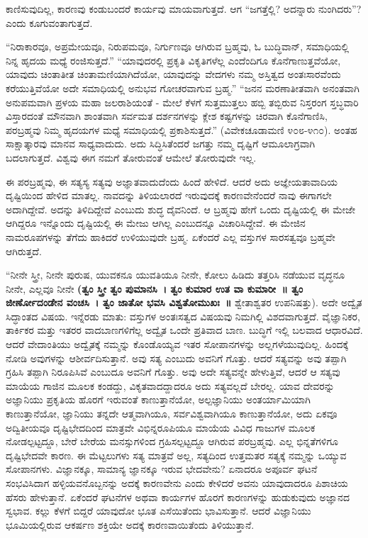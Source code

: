 ಕಾಣಿಸುವುದಿಲ್ಲ, ಕಾರಣವು ಕಂಡುಬಂದರೆ ಕಾರ್ಯವು ಮಾಯವಾಗುತ್ತದೆ. ಆಗ “ಜಗತ್ತೆಲ್ಲಿ? ಅದನ್ನಾರು ನುಂಗಿದರು”? ಎಂದು ಕೂಗುವಂತಾಗುತ್ತದೆ.

“ನಿರಾಕಾರವೂ, ಅಪ್ರಮೇಯವೂ, ನಿರುಪಮವೂ, ನಿರ್ಗುಣವೂ ಆಗಿರುವ ಬ್ರಹ್ಮವು, ಓ ಬುದ್ಧಿವಾನ್​, ಸಮಾಧಿಯಲ್ಲಿ ನಿನ್ನ ಹೃದಯ ಮಧ್ಯೆ ರಂಜಿಸುತ್ತದೆ.” “ಯಾವುದರಲ್ಲಿ ಪ್ರಕೃತಿ ವಿಕೃತಿಗಳೆಲ್ಲ ಎಂದೆಂದಿಗೂ ಕೊನೆಗಾಣುತ್ತವೆಯೋ, ಯಾವುದು ಚಿಂತಾತೀತ ಚಿಂತಾಮಣಿಯಾಗಿದೆಯೋ, ಯಾವುದನ್ನು ವೇದಗಳು ನಮ್ಮ ಅಸ್ತಿತ್ವದ ಅಂತಃಸಾರವೆಂದು ಕರೆಯುತ್ತಿವೆಯೋ ಅದೇ ಸಮಾಧಿಯಲ್ಲಿ ಅನುಭವ ಗೋಚರವಾಗುವ ಬ್ರಹ್ಮ.” “ಜನನ ಮರಣಾತೀತವಾಗಿ ಅನಂತವಾಗಿ ಅನುಪಮವಾಗಿ ಪ್ರಳಯ ಮಹಾ ಜಲರಾಶಿಯಂತೆ - ಮೇಲೆ ಕೆಳಗೆ ಸುತ್ತಮುತ್ತಲು ಹಬ್ಬಿ ತಬ್ಬಿರುವ ನಿಸ್ತರಂಗ ಸ್ತಬ್ಧವಾರಿ ವಿಸ್ತಾರದಂತೆ ಮೌನವಾಗಿ ಶಾಂತವಾಗಿ ಸರ್ವಮತ ದರ್ಶನಗಳನ್ನು ಕ್ಲೇಶ ಕಷ್ಟಗಳನ್ನು ಚಿರವಾಗಿ ಕೊನೆಗಾಣಿಸಿ, ಪರಬ್ರಹ್ಮವು ನಿಮ್ಮ ಹೃದಯಗಳ ಮಧ್ಯೆ ಸಮಾಧಿಯಲ್ಲಿ ಪ್ರಕಾಶಿಸುತ್ತದೆ.” (ವಿವೇಕಚೂಡಾಮಣಿ ೪೦೮-೪೧೦). ಅಂತಹ ಸಾಕ್ಷಾತ್ಕಾರವು ಮಾನವ ಸಾಧ್ಯವಾದುದು. ಅದು ಸಿದ್ಧಿಸಿತೆಂದರೆ ಜಗತ್ತು ನಮ್ಮ ದೃಷ್ಟಿಗೆ ಆಮೂಲಾಗ್ರವಾಗಿ ಬದಲಾಗುತ್ತದೆ. ವಿಶ್ವವು ಈಗ ನಮಗೆ ತೋರುವಂತೆ ಆಮೇಲೆ ತೋರುವುದೇ ಇಲ್ಲ.

ಈ ಪರಬ್ರಹ್ಮವು, ಈ ಸತ್ಯಸ್ಯ ಸತ್ಯವು ಅಜ್ಞಾತವಾದುದೆಂದು ಹಿಂದೆ ಹೇಳಿದೆ. ಆದರೆ ಅದು ಅಜ್ಞೇಯತಾವಾದಿಯ ದೃಷ್ಟಿಯಿಂದ ಹೇಳಿದ ಮಾತಲ್ಲ. ನಾವದನ್ನು ತಿಳಿಯಲಾರದೆ ಇರುವುದಕ್ಕೆ ಕಾರಣವೇನೆಂದರೆ ನಾವು ಈಗಾಗಲೇ ಅದಾಗಿದ್ದೇವೆ. ಅದನ್ನು ತಿಳಿದಿದ್ದೇವೆ ಎಂಬುದು ಶುದ್ಧ ದೈವನಿಂದೆ. ಆ ಬ್ರಹ್ಮವು ಹೇಗೆ ಒಂದು ದೃಷ್ಟಿಯಲ್ಲಿ ಈ ಮೇಜೇ ಆಗಿದ್ದರೂ ಇನ್ನೊಂದು ದೃಷ್ಟಿಯಲ್ಲಿ ಈ ಮೇಜು ಆಗಿಲ್ಲ ಎಂಬುದನ್ನೂ ವಿಚಾರಿಸಿದ್ದೇವೆ. ಈ ಮೇಜಿನ ನಾಮರೂಪಗಳನ್ನು ತೆಗೆದು ಹಾಕಿದರೆ ಉಳಿಯುವುದೇ ಬ್ರಹ್ಮ. ಏಕೆಂದರೆ ಎಲ್ಲ ವಸ್ತುಗಳ ಸಾರಸತ್ವವೂ ಬ್ರಹ್ಮವೇ ಆಗಿರುತ್ತದೆ.

“ನೀನೇ ಸ್ತ್ರೀ, ನೀನೇ ಪುರುಷ, ಯುವಕನೂ ಯುವತಿಯೂ ನೀನೇ, ಕೋಲು ಹಿಡಿದು ತತ್ತರಿಸಿ ನಡೆಯುವ ವೃದ್ಧನೂ ನೀನೇ, ಎಲ್ಲವೂ ನೀನೇ \textbf{(ತ್ವಂ ಸ್ತ್ರೀ ತ್ವಂ ಪುಮಾನಸಿ~। ತ್ವಂ ಕುಮಾರ ಉತ ವಾ ಕುಮಾರೀ~॥ ತ್ವಂ ಜೀರ್ಣೋದಂಡೇನ ವಂಚಸಿ~। ತ್ವಂ ಜಾತೋ ಭವಸಿ ವಿಶ್ವತೋಮುಖಃ~॥} ಶ್ವೇತಾಶ್ವತರ ಉಪನಿಷತ್ತು). ಅದೇ ಅದ್ವೈತ ಸಿದ್ಧಾಂತದ ವಿಷಯ. ಇನ್ನೆರಡು ಮಾತು: ವಸ್ತುಗಳ ಅಂತಃಸತ್ವದ ವಿಷಯವು ನಿಮಗಿಲ್ಲಿ ವಿಶದವಾಗುತ್ತದೆ. ವೈಜ್ಞಾನಿಕರ, ತಾರ್ಕಿಕರ ಮತ್ತು ಇತರರ ವಾದಬಾಣಗಳಿಗೆಲ್ಲ ಅದ್ವೈತ ಒಂದೇ ಪ್ರತಿವಾದ ಬಾಣ. ಬುದ್ಧಿಗೆ ಇಲ್ಲಿ ಬಲವಾದ ಆಧಾರವಿದೆ. ಆದರೆ ವೇದಾಂತಿಯು ಅದ್ವೈತಕ್ಕೆ ನಮ್ಮನ್ನು ಕೊಂಡೊಯ್ಯವ ಇತರ ಸೋಪಾನಗಳನ್ನು ಅಲ್ಲಗಳೆಯುವುದಿಲ್ಲ. ಹಿಂದಕ್ಕೆ ನೋಡಿ ಅವುಗಳನ್ನು ಆಶೀರ್ವದಿಸುತ್ತಾನೆ. ಅವು ಸತ್ಯ ಎಂಬುದು ಅವನಿಗೆ ಗೊತ್ತು. ಆದರೆ ಸತ್ಯವನ್ನು ಅವು ತಪ್ಪಾಗಿ ಗ್ರಹಿಸಿ ತಪ್ಪಾಗಿ ನಿರೂಪಿಸಿವೆ ಎಂಬುದೂ ಅವನಿಗೆ ಗೊತ್ತು. ಅವು ಅದೇ ಸತ್ಯವನ್ನೇ ಹೇಳುತ್ತಿವೆ, ಆದರೆ ಆ ಸತ್ಯವು ಮಾಯೆಯ ಗಾಜಿನ ಮೂಲಕ ಕಂಡದ್ದು, ವಿಕೃತವಾದದ್ದಾದರೂ ಅದು ಸತ್ಯವಲ್ಲದೆ ಬೇರಲ್ಲ. ಯಾವ ದೇವರನ್ನು ಅಜ್ಞಾನಿಯು ಪ್ರಕೃತಿಯ ಹೊರಗೆ ಇರುವಂತೆ ಕಾಣುತ್ತಾನೆಯೋ, ಅಲ್ಪಜ್ಞಾನಿಯು ಅಂತರ್ಯಾಮಿಯಾಗಿ ಕಾಣುತ್ತಾನೆಯೋ, ಜ್ಞಾನಿಯು ತನ್ನದೇ ಆತ್ಮವಾಗಿಯೂ, ಸರ್ವವಿಶ್ವವಾಗಿಯೂ ಕಾಣುತ್ತಾನೆಯೋ, ಅದು ಏಕವೂ ಅದ್ವಿತೀಯವೂ ದೃಷ್ಟಿಭೇದದಿಂದ ಮಾತ್ರವೇ ವಿಭಿನ್ನರೂಪಿಯೂ ಮಾಯೆಯ ವಿವಿಧ ಗಾಜುಗಳ ಮೂಲಕ ನೋಡಲ್ಪಟ್ಟದ್ದೂ, ಬೇರೆ ಬೇರೆಯ ಮನಸ್ಸುಗಳಿಂದ ಗ್ರಹಿಸಲ್ಪಟ್ಟದ್ದೂ ಆಗಿರುವ ಪರಬ್ರಹ್ಮವು. ಎಲ್ಲ ಭಿನ್ನತೆಗಳಿಗೂ ದೃಷ್ಟಿಭೇದವೇ ಕಾರಣ. ಈ ಮೆಟ್ಟಲುಗಳು ಸತ್ಯ ಮಾತ್ರವೆ ಅಲ್ಲ, ಸತ್ಯದಿಂದ ಉತ್ತಮತರ ಸತ್ಯಕ್ಕೆ ನಮ್ಮನ್ನು ಒಯ್ಯುವ ಸೋಪಾನಗಳು. ವಿಜ್ಞಾನಕ್ಕೂ, ಸಾಮಾನ್ಯ ಜ್ಞಾನಕ್ಕೂ ಇರುವ ಭೇದವೇನು? ಏನಾದರೂ ಅಪೂರ್ವ ಘಟನೆ ಸಂಭವಿಸಿದಾಗ ಹಳ್ಳಿಯವನೊಬ್ಬನನ್ನು ಅದಕ್ಕೆ ಕಾರಣವೇನು ಎಂದು ಕೇಳಿದರೆ ಅವನು ಯಾವುದಾದರೂ ಪಿಶಾಚಿಯ ಹೆಸರು ಹೇಳುತ್ತಾನೆ. ಏಕೆಂದರೆ ಘಟನೆಗಳ ಅಥವಾ ಕಾರ್ಯಗಳ ಹೊರಗೆ ಕಾರಣಗಳನ್ನು ಹುಡುಕುವುದು ಅಜ್ಞಾನದ ಸ್ವಭಾವ. ಕಲ್ಲು ಕೆಳಗೆ ಬಿದ್ದರೆ ಯಾವುದೋ ಭೂತ ಎಸೆಯಿತೆಂದು ಭಾವಿಸುತ್ತಾನೆ. ಆದರೆ ವಿಜ್ಞಾನಿಯು ಭೂಮಿಯಲ್ಲಿರುವ ಆಕರ್ಷಣ ಶಕ್ತಿಯೇ ಅದಕ್ಕೆ ಕಾರಣವಾಯಿತೆಂದು ತಿಳಿಯುತ್ತಾನೆ.

